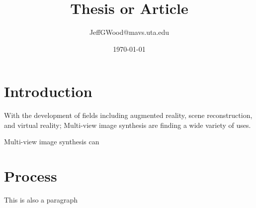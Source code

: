 \documentclass[a4paper,10pt]{article}
\title{Thesis or Article}
\author{JeffGWood@mavs.uta.edu}
\date{\today}
\newcommand{\cAij}[2]{\ensuremath{a_{{#1},{#2}}}}
\begin{document}
\maketitle



\normalsize
\section{Introduction}
\par\indent 
With the development of fields including augmented reality, scene reconstruction, and virtual reality; Multi-view image synthesis are finding a wide variety of uses.
\par
\indent Multi-view image synthesis can 
\section{Process}
This is also a paragraph

\begin{equation*}
\end{equation*}


%
\end{document}
